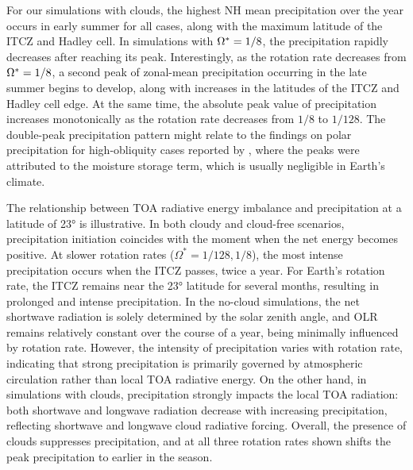 For our simulations with clouds, the highest NH mean precipitation over the year occurs in early summer for all cases, along with the maximum latitude of the ITCZ and Hadley cell. In simulations with $\Omega^*=1/8$, the precipitation rapidly decreases after reaching its peak. Interestingly, as the rotation rate decreases from $\Omega^*=1/8$, a second peak of zonal-mean precipitation occurring in the late summer begins to develop, along with increases in the latitudes of the ITCZ and Hadley cell edge. At the same time, the absolute peak value of precipitation increases monotonically as the rotation rate decreases from $1/8$ to $1/128$. The double-peak precipitation pattern might relate to the findings on polar precipitation for high-obliquity cases reported by \citet{lobo2020-Atmospheric}, where the peaks were attributed to the moisture storage term, which is usually negligible in Earth’s climate.

The relationship between TOA radiative energy imbalance and precipitation at a latitude of \ang{23} is illustrative. In both cloudy and cloud-free scenarios, precipitation initiation coincides with the moment when the net energy becomes positive. At slower rotation rates ($\Omega^* = 1/128, 1/8$), the most intense precipitation occurs when the ITCZ passes, twice a year. For Earth's rotation rate, the ITCZ remains near the \ang{23} latitude for several months, resulting in prolonged and intense precipitation. In the no-cloud simulations, the net shortwave radiation is solely determined by the solar zenith angle, and OLR remains relatively constant over the course of a year, being minimally influenced by rotation rate. However, the intensity of precipitation varies with rotation rate, indicating that strong precipitation is primarily governed by atmospheric circulation rather than local TOA radiative energy. On the other hand, in simulations with clouds, precipitation strongly impacts the local TOA radiation: both shortwave and longwave radiation decrease with increasing precipitation, reflecting shortwave and longwave cloud radiative forcing. Overall, the presence of clouds suppresses precipitation, and at all three rotation rates shown shifts the peak precipitation to earlier in the season.


